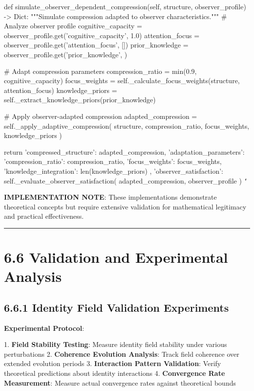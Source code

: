     def simulate_observer_dependent_compression(self, structure, observer_profile) -> Dict:
        """Simulate compression adapted to observer characteristics."""
        \# Analyze observer profile
        cognitive_capacity = observer_profile.get('cognitive_capacity', 1.0)
        attention_focus = observer_profile.get('attention_focus', [])
        prior_knowledge = observer_profile.get('prior_knowledge', {})
        
        \# Adapt compression parameters
        compression_ratio = min(0.9, cognitive_capacity)
        focus_weights = self._calculate_focus_weights(structure, attention_focus)
        knowledge_priors = self._extract_knowledge_priors(prior_knowledge)
        
        \# Apply observer-adapted compression
        adapted_compression = self._apply_adaptive_compression(
            structure, compression_ratio, focus_weights, knowledge_priors
        )
        
        return {
            'compressed_structure': adapted_compression,
            'adaptation_parameters': {
                'compression_ratio': compression_ratio,
                'focus_weights': focus_weights,
                'knowledge_integration': len(knowledge_priors)
            },
            'observer_satisfaction': self._evaluate_observer_satisfaction(
                adapted_compression, observer_profile
            )
        }
\texttt{`}

\textbf{IMPLEMENTATION NOTE}: These implementations demonstrate theoretical concepts but require extensive validation for mathematical legitimacy and practical effectiveness.

\hrule

\section{6.6 Validation and Experimental Analysis}

\subsection{6.6.1 Identity Field Validation Experiments}

\textbf{Experimental Protocol}:

1. \textbf{Field Stability Testing}: Measure identity field stability under various perturbations
2. \textbf{Coherence Evolution Analysis}: Track field coherence over extended evolution periods
3. \textbf{Interaction Pattern Validation}: Verify theoretical predictions about identity interactions
4. \textbf{Convergence Rate Measurement}: Measure actual convergence rates against theoretical bounds

